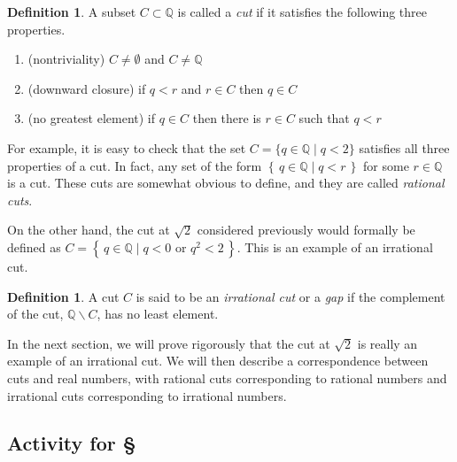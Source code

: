 \documentclass[11pt,oneside]{amsbook}
\newcommand{\set}[1]{\left\{\,#1\,\right\}}
\newcommand{\Q}{\mathbb Q}
\renewcommand{\setminus}{\smallsetminus}
\theoremstyle{definition}
\theoremstyle{plain}
\theoremstyle{definition}
\newtheorem{definition}[theorem]{Definition}
\theoremstyle{remark}
\numberwithin{equation}{section}
\numberwithin{figure}{section}
\begin{document}
\begin{definition}
  A subset $C\subset\Q$ is called a \emph{cut} if it satisfies the following three properties.
  \begin{enumerate}
  \item (nontriviality) $C\neq\emptyset$ and $C\neq\Q$
  \item (downward closure) if $q<r$ and $r\in C$ then $q\in C$
  \item (no greatest element) if $q\in C$ then there is $r\in C$ such that $q<r$
  \end{enumerate}
\end{definition}

For example, it is easy to check that the set $C=\{q\in\Q\mid q<2\}$ satisfies all three properties of a cut. In fact, any set of the form $\set{q\in\Q\mid q<r}$ for some $r\in\Q$ is a cut. These cuts are somewhat obvious to define, and they are called \emph{rational cuts}.

On the other hand, the cut at $\sqrt{2}$ considered previously would formally be defined as $C=\set{q\in\Q\mid q<0\text{ or }q^2<2}$. This is an example of an irrational cut.

\begin{definition}
  A cut $C$ is said to be an \emph{irrational cut} or a \emph{gap} if the complement of the cut, $\Q\setminus C$, has no least element.
\end{definition}

In the next section, we will prove rigorously that the cut at $\sqrt{2}$ is really an example of an irrational cut. We will then describe a correspondence between cuts and real numbers, with rational cuts corresponding to rational numbers and irrational cuts corresponding to irrational numbers.

\newpage
\subsection*{Activity for \S \thesection}
\end{document}
